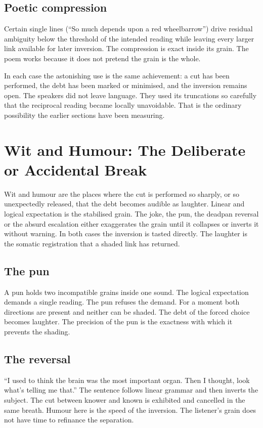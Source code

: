 \documentclass[11pt,a4paper]{article}
\begin{document}
\subsection{Poetic compression} Certain single lines (``So much depends upon a red wheelbarrow'') drive residual ambiguity below the threshold of the intended reading while leaving every larger link available for later inversion. The compression is exact inside its grain. The poem works because it does not pretend the grain is the whole.

In each case the astonishing use is the same achievement: a cut has been performed, the debt has been marked or minimised, and the inversion remains open. The speakers did not leave language. They used its truncations so carefully that the reciprocal reading became locally unavoidable. That is the ordinary possibility the earlier sections have been measuring.

\section{Wit and Humour: The Deliberate or Accidental Break}

Wit and humour are the places where the cut is performed so sharply, or so unexpectedly released, that the debt becomes audible as laughter. Linear and logical expectation is the stabilised grain. The joke, the pun, the deadpan reversal or the absurd escalation either exaggerates the grain until it collapses or inverts it without warning. In both cases the inversion is tasted directly. The laughter is the somatic registration that a shaded link has returned.

\subsection{The pun} A pun holds two incompatible grains inside one sound. The logical expectation demands a single reading. The pun refuses the demand. For a moment both directions are present and neither can be shaded. The debt of the forced choice becomes laughter. The precision of the pun is the exactness with which it prevents the shading.

\subsection{The reversal} ``I used to think the brain was the most important organ. Then I thought, look what’s telling me that.'' The sentence follows linear grammar and then inverts the subject. The cut between knower and known is exhibited and cancelled in the same breath. Humour here is the speed of the inversion. The listener’s grain does not have time to refinance the separation.
\end{document}
